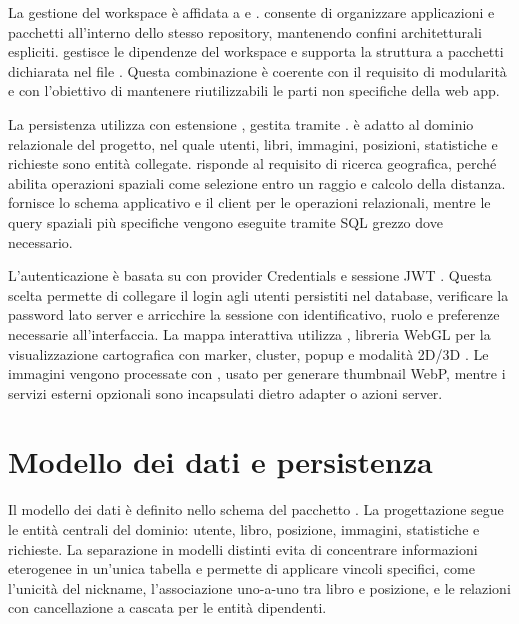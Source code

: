 La gestione del workspace è affidata a \nx{} e  \cite{nx}. \nx{} consente di organizzare applicazioni e pacchetti all'interno dello stesso repository, mantenendo confini architetturali espliciti.  gestisce le dipendenze del workspace e supporta la struttura a pacchetti dichiarata nel file . Questa combinazione è coerente con il requisito di modularità e con l'obiettivo di mantenere riutilizzabili le parti non specifiche della web app.

La persistenza utilizza \postgresql{} con estensione \postgis{}, gestita tramite \prisma{} \cite{postgresql,postgis,prisma}. \postgresql{} è adatto al dominio relazionale del progetto, nel quale utenti, libri, immagini, posizioni, statistiche e richieste sono entità collegate. \postgis{} risponde al requisito di ricerca geografica, perché abilita operazioni spaziali come selezione entro un raggio e calcolo della distanza. \prisma{} fornisce lo schema applicativo e il client per le operazioni relazionali, mentre le query spaziali più specifiche vengono eseguite tramite SQL grezzo dove necessario.

L'autenticazione è basata su \authjs{} con provider Credentials e sessione JWT \cite{authjs}. Questa scelta permette di collegare il login agli utenti persistiti nel database, verificare la password lato server e arricchire la sessione con identificativo, ruolo e preferenze necessarie all'interfaccia. La mappa interattiva utilizza \maplibre{}, libreria WebGL per la visualizzazione cartografica con marker, cluster, popup e modalità 2D/3D \cite{maplibre}. Le immagini vengono processate con , usato per generare thumbnail WebP, mentre i servizi esterni opzionali sono incapsulati dietro adapter o azioni server.

\section{Modello dei dati e persistenza}
\label{sec:modello-dati}

Il modello dei dati è definito nello schema \prisma{} del pacchetto . La progettazione segue le entità centrali del dominio: utente, libro, posizione, immagini, statistiche e richieste. La separazione in modelli distinti evita di concentrare informazioni eterogenee in un'unica tabella e permette di applicare vincoli specifici, come l'unicità del nickname, l'associazione uno-a-uno tra libro e posizione, e le relazioni con cancellazione a cascata per le entità dipendenti.


